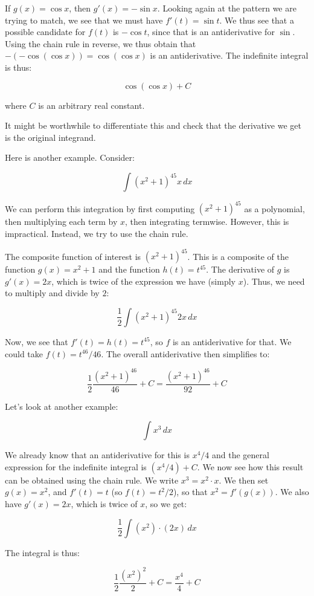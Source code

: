 \documentclass{amsart}
\begin{document}
If $g(x) = \cos x$, then $g'(x) = -\sin x$. Looking again at the
pattern we are trying to match, we see that we must have $f'(t) = \sin
t$. We thus see that a possible candidate for $f(t)$ is $- \cos t$,
since that is an antiderivative for $\sin$. Using the chain rule in
reverse, we thus obtain that $-(-\cos(\cos x)) = \cos(\cos x)$ is an
antiderivative. The indefinite integral is thus:

$$\cos(\cos x) + C$$

where $C$ is an arbitrary real constant.

It might be worthwhile to differentiate this and check that the
derivative we get is the original integrand.

Here is another example. Consider:

$$\int (x^2 + 1)^{45} x \, dx$$

We can perform this integration by first computing $(x^2 + 1)^{45}$ as
a polynomial, then multiplying each term by $x$, then integrating
termwise. However, this is impractical. Instead, we try to use the
chain rule.

The composite function of interest is $(x^2 + 1)^{45}$. This is a
composite of the function $g(x) = x^2 + 1$ and the function $h(t) =
t^{45}$. The derivative of $g$ is $g'(x) = 2x$, which is twice of the
expression we have (simply $x$). Thus, we need to multiply and divide
by $2$:

$$\frac{1}{2} \int (x^2 + 1)^{45} 2x \, dx$$

Now, we see that $f'(t) = h(t) = t^{45}$, so $f$ is an antiderivative
for that. We could take $f(t) = t^{46}/46$. The overall antiderivative
then simplifies to:

$$\frac{1}{2} \frac{(x^2 + 1)^{46}}{46} + C = \frac{(x^2 + 1)^{46}}{92} + C$$

Let's look at another example:

$$\int x^3 \, dx$$

We already know that an antiderivative for this is $x^4/4$ and the
general expression for the indefinite integral is $(x^4/4) + C$. We
now see how this result can be obtained using the chain rule. We write
$x^3 = x^2 \cdot x$. We then set $g(x) = x^2$, and $f'(t) = t$ (so
$f(t) = t^2/2$), so that $x^2 = f'(g(x))$. We also have $g'(x) = 2x$,
which is twice of $x$, so we get:

$$\frac{1}{2} \int (x^2) \cdot (2x) \, dx$$

The integral is thus:

$$\frac{1}{2} \frac{(x^2)^2}{2} + C = \frac{x^4}{4} + C$$
\end{document}

